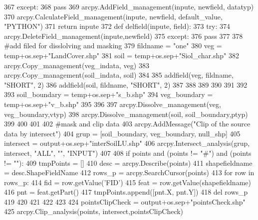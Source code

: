 \begin{DoxyCode}
367       \textcolor{keywordflow}{except}:
368         \textcolor{keywordflow}{pass}
369       arcpy.AddField\_management(inpute, newfield, datatyp)
370       arcpy.CalculateField\_management(inpute, newfield, default\_value, \textcolor{stringliteral}{"PYTHON"})
371       \textcolor{keywordflow}{return} inpute
372   \textcolor{keyword}{def }delfield(inpute, field):
373       \textcolor{keywordflow}{try}:
374         arcpy.DeleteField\_management(inpute,newfield)
375       \textcolor{keywordflow}{except}:
376         \textcolor{keywordflow}{pass}
377 
378   \textcolor{comment}{#add filed for disslolving and masking
}
379   fildname = \textcolor{stringliteral}{"one"}
380   veg = temp+os.sep+\textcolor{stringliteral}{"LandCover.shp"}
381   soil = temp+os.sep+\textcolor{stringliteral}{"Siol\_char.shp"}
382   arcpy.Copy\_management(veg\_indata, veg)
383   arcpy.Copy\_management(soil\_indata, soil)
384 
385   addfield(veg, fildname, \textcolor{stringliteral}{"SHORT"}, 2)
386   addfield(soil, fildname, \textcolor{stringliteral}{"SHORT"}, 2)
387 
388 
389 
390 
391 
392 
393   soil\_boundary = temp+os.sep+\textcolor{stringliteral}{"s\_b.shp"}
394   veg\_boundary = temp+os.sep+\textcolor{stringliteral}{"v\_b.shp"}
395 
396 
397   arcpy.Dissolve\_management(veg, veg\_boundary,vtyp)
398   arcpy.Dissolve\_management(soil, soil\_boundary,ptyp)
399 
400 
401 
402   \textcolor{comment}{#mask and clip data
}
403   arcpy.AddMessage(\textcolor{stringliteral}{"Clip of the source data by intersect"})
404   grup = [soil\_boundary, veg\_boundary, null\_shp]
405   intersect = output+os.sep+\textcolor{stringliteral}{"interSoilLU.shp"}
406   arcpy.Intersect\_analysis(grup, intersect, \textcolor{stringliteral}{"ALL"}, \textcolor{stringliteral}{""}, \textcolor{stringliteral}{"INPUT"})
407 
408   \textcolor{keywordflow}{if} points \textcolor{keywordflow}{and} (points != \textcolor{stringliteral}{"#"}) \textcolor{keywordflow}{and} (points != \textcolor{stringliteral}{""}):
409       tmpPoints = []
410       desc = arcpy.Describe(points)
411       shapefieldname = desc.ShapeFieldName
412       rows\_p = arcpy.SearchCursor(points)
413       \textcolor{keywordflow}{for} row \textcolor{keywordflow}{in} rows\_p:
414         fid = row.getValue(\textcolor{stringliteral}{'FID'})
415         feat = row.getValue(shapefieldname)
416         pnt = feat.getPart()
417         tmpPoints.append([pnt.X, pnt.Y])
418       del rows\_p
419 
420 
421 
422 
423 
424       pointsClipCheck = output+os.sep+\textcolor{stringliteral}{"pointsCheck.shp"}
425       arcpy.Clip\_analysis(points, intersect,pointsClipCheck)

\end{DoxyCode}

